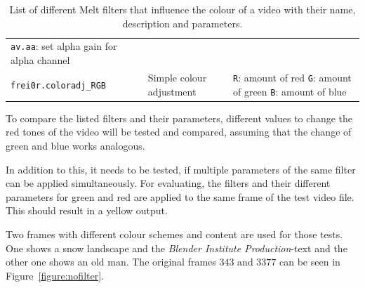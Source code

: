 \documentclass[../MasterThesis.tex]{subfiles}
\begin{document}
\begin{table}[H]
\begin{tabular}{lp{4.4cm}p{4.5cm}}
{		\texttt{av.aa}: set alpha gain for alpha channel}
		\\
		\texttt{frei0r.coloradj\_RGB} & Simple colour adjustment & 
		\tiny{
		\texttt{R}: amount of red \newline 
		\texttt{G}: amount of green \newline 
		\texttt{B}: amount of blue}
		\\
		\bottomrule
	\end{tabular}
	\caption[List of Melt filters that influence the colour of a video.]{List of different Melt filters that influence the colour of a video with their name, description and parameters.}
\end{table}






%


To compare the listed filters and their parameters, different values to change the red tones of the video will be tested and compared, assuming that the change of green and blue works analogous.

In addition to this, it needs to be tested, if multiple parameters of the same filter can be applied simultaneously. For evaluating, the filters and their different parameters for green and red are applied to the same frame of the test video file. This should result in a yellow output. 

Two frames with different colour schemes and content are used for those tests. One shows a snow landscape and the \textit{Blender Institute Production}-text and the other one shows an old man. The original frames $343$ and $3377$ can be seen in Figure~\ref{figure:nofilter}.
\end{document}
